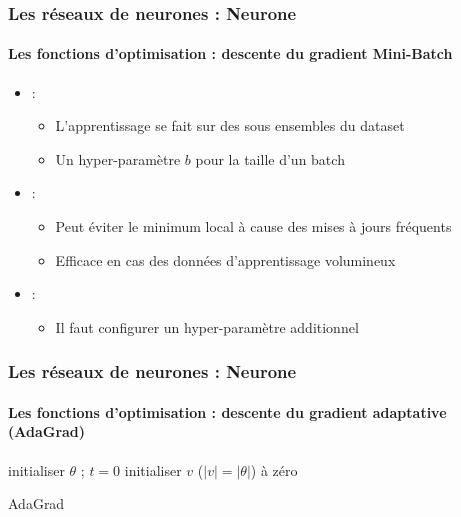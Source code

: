 \documentclass[xcolor=table]{beamer}
\begin{document}
\begin{frame}
\frametitle{Les réseaux de neurones : Neurone}
\framesubtitle{Les fonctions d'optimisation : descente du gradient Mini-Batch}

\begin{itemize}
	\item {} : 
	\begin{itemize}
		\item L'apprentissage se fait sur des sous ensembles du dataset
		\item Un hyper-paramètre $b$ pour la taille d'un batch
	\end{itemize}
	\item {} : 
	\begin{itemize}
		\item Peut éviter le minimum local à cause des mises à jours fréquents
		\item Efficace en cas des données d'apprentissage volumineux
	\end{itemize}
	\item {} : 
	\begin{itemize}
		\item Il faut configurer un hyper-paramètre additionnel 
	\end{itemize}
\end{itemize}

\end{frame}


\begin{frame}
\frametitle{Les réseaux de neurones : Neurone}
\framesubtitle{Les fonctions d'optimisation : descente du gradient adaptative (AdaGrad)}

\begin{algorithm}[H]
	\KwResult{$ \theta $}
	initialiser $ \theta $ ; $ t = 0 $\;
	initialiser $v$ ($|v| = |\theta|$) à zéro\;
	\caption{AdaGrad \cite{2011-duchi-al}}
\end{algorithm}

\end{frame}
\end{document}
